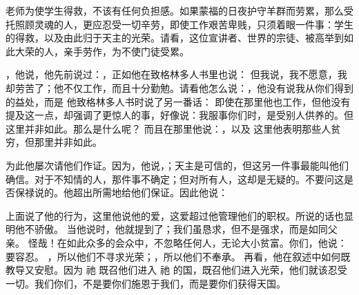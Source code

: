 老师为使学生得救，不该有任何负担感。如果蒙福的日夜护守羊群而劳累，那么受托照顾灵魂的人，更应忍受一切辛劳，即使工作艰苦卑贱，只须着眼一件事：学生的得救，以及由此归于天主的光荣。请看，这位宣讲者、世界的宗徒、被高举到如此大荣的人，亲手劳作，为不使门徒受累。\par

，他说，他先前说过：，正如他在致格林多人书里也说：  但我说，我不愿意，我却劳苦了；他不仅工作，而且十分勤勉。请看他怎么说：，他没有说我从你们得到的益处，而是 他致格林多人书时说了另一番话：  即使在那里他也工作，但他没有提及这一点，却强调了更惊人的事，好像说：我服事你们时，是受别人供养的。但这里并非如此。那么是什么呢？ 而且在那里他说：，以及  这里他表明那些人贫穷，但那里并非如此。\par

为此他屡次请他们作证。因为，他说，；天主是可信的，但这另一件事最能叫他们确信。对于不知情的人，那件事不确定；但对所有人，这却是无疑的。不要问这是否保禄说的。他超出所需地给他们保证。因此他说：\par

 上面说了他的行为，这里他说他的爱，这爱超过他管理他们的职权。所说的话也显明他不骄傲。 当他说时，他就提到了；我们虽恳求，但不是强求，而是如同父亲。 怪哉！在如此众多的会众中，不忽略任何人，无论大小贫富。你们，他说：要容忍。 ，所以他们不寻求光荣；，所以他们不奉承。 再看，他在叙述中如何既教导又安慰。因为 祂 既召他们进入 祂 的国，既召他们进入光荣，他们就该忍受一切。我们你们，不是要你们施恩于我们，而是要你们获得天国。\par

